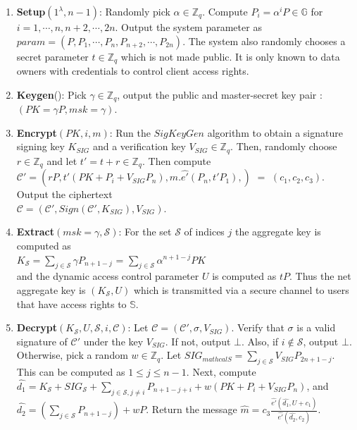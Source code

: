 \begin{enumerate}
 \item \textbf{Setup}$(1^{\lambda},n-1)$: Randomly pick $\alpha \in \mathbb{Z}_q$. Compute $P_i = {\alpha^{i}}P \in \mathbb{G}$ for $i = 1,\cdots,n,n+2,\cdots,2n$. Output the system parameter as\\
 $param = (P,P_1,\cdots,P_n,P_{n+2},\cdots,P_{2n})$. The system also randomly chooses a secret parameter $t \in \mathbb{Z}_q$ which is not made public. It is only known to data owners with credentials to control client access rights.
 \item \textbf{Keygen}(): Pick $\gamma \in \mathbb{Z}_q$, output the public and master-secret key pair : \\$(PK={\gamma}P,msk=\gamma)$.
 \item \textbf{Encrypt}$(PK,i,m)$: Run the $SigKeyGen$ algorithm to obtain a signature signing key $K_{SIG}$ and a verification key $V_{SIG} \in \mathbb{Z}_q$. Then, randomly choose $r\in\mathbb{Z}_q$ and let $t'=t+r \in\mathbb{Z}_q$. Then compute\\ $\mathcal{C}'=(rP,t'{(PK+P_i+V_{SIG}P_n)},m.\hat{e'}(P_n,t'P_1),)$ $=$ $(c_1,c_2,c_3)$. Output the ciphertext\\
 $\mathcal{C}=(\mathcal{C}',Sign(\mathcal{C}',K_{SIG}),V_{SIG})$.
 \item \textbf{Extract}$(msk=\gamma,\mathcal{S})$: For the set $\mathcal{S}$ of indices $j$ the aggregate key is computed as\\ $K_{\mathcal{S}} = \sum_{j\in\mathcal{S}}{\gamma}P_{n+1-j}$ = $\sum_{j\in\mathcal{S}}\alpha^{n+1-j}PK$\\ and the dynamic access control parameter $U$ is computed as $tP$. Thus the net aggregate key is $(K_{\mathcal{S}},U)$ which is transmitted via a secure channel to users that have access rights to $\mathbb{S}$.
 \item \textbf{Decrypt}$(K_{\mathcal{S}}, U, \mathcal{S},i,\mathcal{C})$: Let $\mathcal{C}=(\mathcal{C}',\sigma,V_{SIG})$. Verify that $\sigma$ is a valid signature of $\mathcal{C}'$ under the key $V_{SIG}$. If not, output $\bot$. Also, if $i\notin\mathcal{S}$, output $\bot$. Otherwise, pick a random $w\in \mathbb{Z}_q$. Let $SIG_{mathcal{S}}=\sum_{j\in\mathcal{S}}V_{SIG}P_{2n+1-j}$. This can be computed as $1\leq j\leq n-1$. Next, compute\\ $\hat{d_1}=K_{\mathcal{S}}+SIG_{\mathcal{S}}+\sum_{j\in\mathcal{S},j\neq i}P_{n+1-j+i} + w(PK+P_i+V_{SIG}P_n)$, and $\hat{d_2}=(\sum_{j\in\mathcal{S}}P_{n+1-j})+wP$. Return the message $\hat{m}=c_3\frac{\hat{e'}(\hat{d_1},U+c_1)}{\hat{e'}(\hat{d_2},c_2)}$. 
\end{enumerate}


